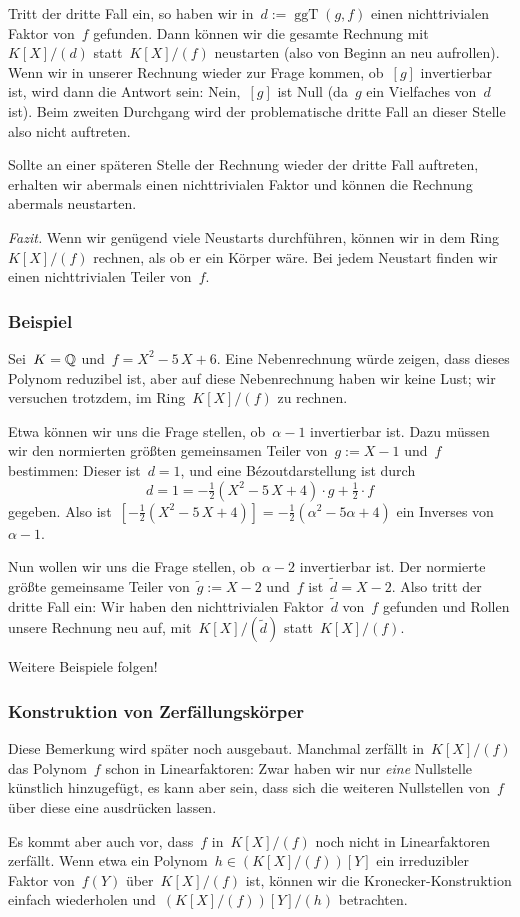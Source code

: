 \documentclass{../../alg2/algblatt}
\begin{document}
Tritt der dritte Fall ein, so haben wir in~$d :=
\operatorname{ggT}(g,f)$ einen nichttrivialen Faktor von~$f$ gefunden. Dann
können wir die gesamte Rechnung mit~$K[X]/(d)$ statt~$K[X]/(f)$ neustarten
(also von Beginn an neu aufrollen). Wenn wir in unserer Rechnung wieder zur
Frage kommen, ob~$[g]$ invertierbar ist, wird dann die Antwort sein:
Nein,~$[g]$ ist Null (da~$g$ ein Vielfaches von~$d$ ist). Beim zweiten
Durchgang wird der problematische dritte Fall an dieser Stelle also nicht
auftreten.

Sollte an einer späteren Stelle der Rechnung wieder der dritte Fall auftreten,
erhalten wir abermals einen nichttrivialen Faktor und können die Rechnung
abermals neustarten.

\emph{Fazit.} Wenn wir genügend viele Neustarts durchführen, können wir
in dem Ring~$K[X]/(f)$ rechnen, als ob er ein Körper wäre. Bei jedem Neustart
finden wir einen nichttrivialen Teiler von~$f$.


\subsubsection*{Beispiel}

Sei~$K = \mathbb{Q}$ und~$f = X^2 - 5\,X + 6$. Eine Nebenrechnung
würde zeigen, dass dieses Polynom reduzibel ist, aber auf diese Nebenrechnung
haben wir keine Lust; wir versuchen trotzdem, im Ring~$K[X]/(f)$ zu rechnen.

Etwa können wir uns die Frage stellen, ob~$\alpha - 1$ invertierbar ist. Dazu
müssen wir den normierten größten gemeinsamen Teiler von~$g := X - 1$ und~$f$
bestimmen: Dieser ist~$d = 1$, und eine Bézoutdarstellung ist durch
\[ d = 1 = -\tfrac{1}{2}(X^2 - 5\,X + 4) \cdot g + \tfrac{1}{2} \cdot f \]
gegeben. Also ist~$[-\tfrac{1}{2}(X^2-5\,X+4)] =
-\tfrac{1}{2}(\alpha^2-5\alpha+4)$ ein Inverses von~$\alpha - 1$.

Nun wollen wir uns die Frage stellen, ob~$\alpha - 2$ invertierbar ist. Der
normierte größte gemeinsame Teiler von~$\tilde g := X - 2$ und~$f$ ist~$\tilde
d = X-2$. Also tritt der dritte Fall ein: Wir haben den nichttrivialen
Faktor~$\tilde d$ von~$f$ gefunden und Rollen unsere Rechnung neu auf,
mit~$K[X]/(\tilde d)$ statt~$K[X]/(f)$.

Weitere Beispiele folgen!


\subsubsection*{Konstruktion von Zerfällungskörper}

Diese Bemerkung wird später noch ausgebaut. Manchmal zerfällt in~$K[X]/(f)$ das
Polynom~$f$ schon in Linearfaktoren: Zwar haben wir nur \emph{eine} Nullstelle
künstlich hinzugefügt, es kann aber sein, dass sich die weiteren Nullstellen
von~$f$ über diese eine ausdrücken lassen.

Es kommt aber auch vor, dass~$f$ in~$K[X]/(f)$ noch nicht in Linearfaktoren
zerfällt. Wenn etwa ein Polynom~$h \in (K[X]/(f))[Y]$ ein irreduzibler Faktor
von~$f(Y)$ über~$K[X]/(f)$ ist, können wir die Kronecker-Konstruktion einfach
wiederholen und~$(K[X]/(f))[Y]/(h)$ betrachten.
\end{document}
